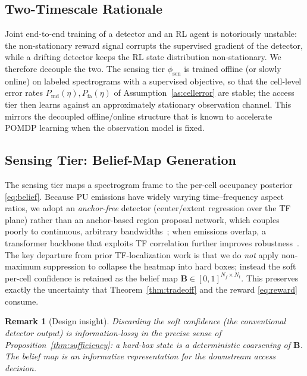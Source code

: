 \documentclass[journal]{IEEEtran}
\newtheorem{remark}{Remark}
\newcommand{\Nf}{N_f}                      %
\newcommand{\Nt}{N_t}                      %
\newcommand{\belmap}{\bm{B}}               %
\newcommand{\Pmd}{P_{\mathrm{md}}}         %
\newcommand{\Pfa}{P_{\mathrm{fa}}}         %
\newcommand{\thr}{\eta}                    %
\begin{document}
\subsection{Two-Timescale Rationale}
\label{subsec:twotimescale}
Joint end-to-end training of a detector and an RL agent is notoriously
unstable: the non-stationary reward signal corrupts the supervised gradient
of the detector, while a drifting detector keeps the RL state distribution
non-stationary. We therefore decouple the two. The sensing tier
$\phi_{\mathrm{sen}}$ is trained offline (or slowly online) on labeled
spectrograms with a supervised objective, so that the cell-level error rates
$\Pmd(\thr),\Pfa(\thr)$ of Assumption~\ref{as:cellerror} are stable; the
access tier then learns against an approximately stationary observation
channel. This mirrors the decoupled offline/online structure that is known
to accelerate POMDP learning when the observation model is fixed.

\subsection{Sensing Tier: Belief-Map Generation}
\label{subsec:sensing_tier}
The sensing tier maps a spectrogram frame to the per-cell occupancy
posterior \eqref{eq:belief}. Because PU emissions have widely varying
time--frequency aspect ratios, we adopt an \emph{anchor-free} detector
(center/extent regression over the TF plane) rather than an anchor-based
region proposal network, which couples poorly to continuous, arbitrary
bandwidths~\cite{zhao2024uav}; when emissions overlap, a transformer backbone
that exploits TF correlation further improves
robustness~\cite{zhao2025trtfl_ssl}. The key departure from prior
TF-localization work is that we do \emph{not} apply non-maximum suppression
to collapse the heatmap into hard boxes; instead the soft per-cell confidence
is retained as the belief map $\belmap\in[0,1]^{\Nf\times\Nt}$. This
preserves exactly the uncertainty that Theorem~\ref{thm:tradeoff} and the
reward \eqref{eq:reward} consume.

\begin{remark}[Design insight]
Discarding the soft confidence (the conventional detector output) is
information-lossy in the precise sense of Proposition~\ref{thm:sufficiency}: a
hard-box state is a deterministic coarsening of $\belmap$. The belief map is
an informative representation for the downstream access decision.
\end{remark}
\end{document}
